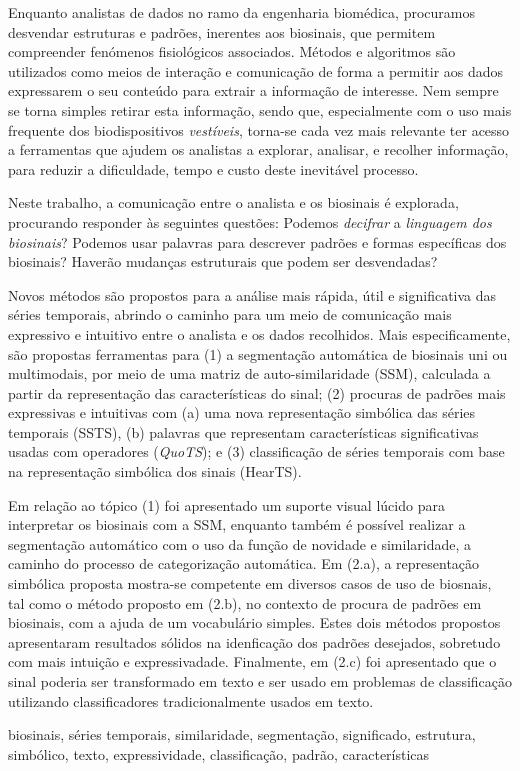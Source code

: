 
%

Enquanto analistas de dados no ramo da engenharia biomédica, procuramos desvendar estruturas e padrões, inerentes aos biosinais, que permitem compreender fenómenos fisiológicos associados. Métodos e algoritmos são utilizados como meios de interação e comunicação de forma a permitir aos dados expressarem o seu conteúdo para extrair a informação de interesse. Nem sempre se torna simples retirar esta informação, sendo que, especialmente com o uso mais frequente dos biodispositivos \textit{vestíveis}, torna-se cada vez mais relevante ter acesso a ferramentas que ajudem os analistas a explorar, analisar, e recolher informação, para reduzir a dificuldade, tempo e custo deste inevitável processo.

Neste trabalho, a comunicação entre o analista e os biosinais é explorada, procurando responder às seguintes questões: Podemos \textit{decifrar} a \textit{linguagem dos biosinais}? Podemos usar palavras para descrever padrões e formas específicas dos biosinais? Haverão mudanças estruturais que podem ser desvendadas? 

Novos métodos são propostos para a análise mais rápida, útil e significativa das séries temporais, abrindo o caminho para um meio de comunicação mais expressivo e intuitivo entre o analista e os dados recolhidos. Mais especificamente, são propostas ferramentas para (1) a segmentação automática de biosinais uni ou multimodais, por meio de uma matriz de auto-similaridade (SSM), calculada a partir da representação das características do sinal; (2) procuras de padrões mais expressivas e intuitivas com (a) uma nova representação simbólica das séries temporais (SSTS), (b) palavras que representam características significativas usadas com operadores (\textit{QuoTS}); e (3) classificação de séries temporais com base na representação simbólica dos sinais (HearTS).

Em relação ao tópico (1) foi apresentado um suporte visual lúcido para interpretar os biosinais com a SSM, enquanto também é possível realizar a segmentação automático com o uso da função de novidade e similaridade, a caminho do processo de categorização automática. Em (2.a), a representação simbólica proposta mostra-se competente em diversos casos de uso de biosnais, tal como o método proposto em (2.b), no contexto de procura de padrões em biosinais, com a ajuda de um vocabulário simples. Estes dois métodos propostos apresentaram resultados sólidos na idenficação dos padrões desejados, sobretudo com mais intuição e expressivadade. Finalmente, em (2.c) foi apresentado que o sinal poderia ser transformado em texto e ser usado em problemas de classificação utilizando classificadores tradicionalmente usados em texto.

\begin{keywords}
biosinais, séries temporais, similaridade, segmentação, significado, estrutura, simbólico, texto, expressividade, classificação, padrão, características
\end{keywords}
